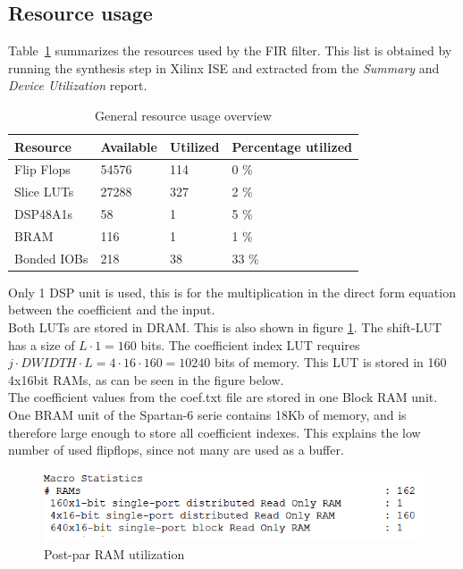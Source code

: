 \documentclass[a4paper,twoside,11pt, fleqn]{article}
\begin{document}
\subsection{Resource usage}
\label{sec:resc4}
Table~\ref{tab:4usage} summarizes the resources used by the FIR filter. This list is obtained by running the synthesis step in Xilinx ISE and extracted from the \textit{Summary} and \textit{Device Utilization} report.

\begin{table}[h]
\begin{tabular}{|l|l|l|l|}
\hline
\textbf{Resource} & \textbf{Available} & \textbf{Utilized} & \textbf{Percentage utilized}\\
\hline
Flip Flops	& 54576 & 114 	& 0 \%\\
Slice LUTs 	& 27288 & 327 	& 2 \%\\
DSP48A1s	& 58 	& 1 	& 5 \%\\
BRAM		& 116 	& 1 	& 1 \%\\
Bonded IOBs	& 218 	& 38 	& 33 \%\\
\hline
\end{tabular}
\caption{General resource usage overview}
\label{tab:4usage}
\end{table}

Only 1 DSP unit is used, this is for the multiplication in the direct form equation between the coefficient and the input.\\

Both LUTs are stored in DRAM. This is also shown in figure \ref{fig:RAM}. The shift-LUT has a size of $L\cdot 1 = 160$ bits. The coefficient index LUT requires $j\cdot DWIDTH\cdot L = 4\cdot 16 \cdot 160 = 10240$ bits of memory. This LUT is stored in 160 4x16bit RAMs, as can be seen in the figure below.\\ 

The coefficient values from the coef.txt file are stored in one Block RAM unit. One BRAM  unit of the Spartan-6 serie contains 18Kb of memory, and is therefore large enough to store all coefficient indexes. This explains the low number of used flipflops, since not many are used as a buffer.

\begin{figure}[h]
	\includegraphics[scale = 0.9]{Images/simulation_missingregisters}
    \caption{Post-par RAM utilization}
    \label{fig:RAM}
\end{figure}
\end{document}
